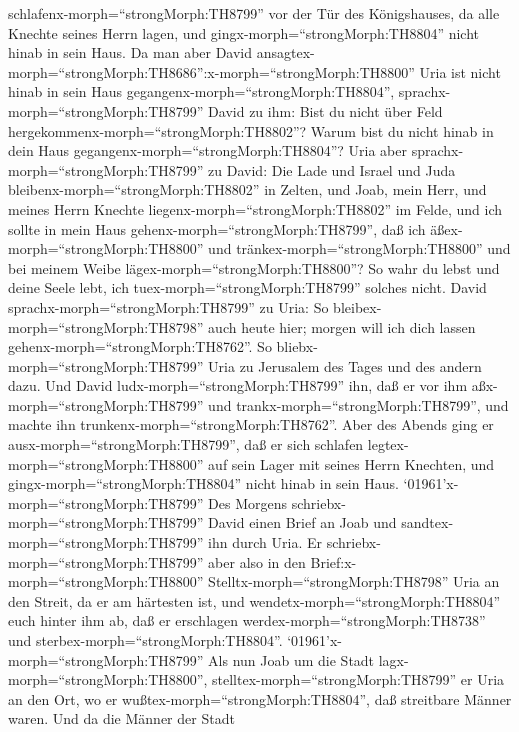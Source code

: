 schlafenx-morph=``strongMorph:TH8799'' vor der Tür des Königshauses, da
alle Knechte seines Herrn lagen, und gingx-morph=``strongMorph:TH8804''
nicht hinab in sein Haus.  Da man aber David
ansagtex-morph=``strongMorph:TH8686'':x-morph=``strongMorph:TH8800''
Uria ist nicht hinab in sein Haus
gegangenx-morph=``strongMorph:TH8804'',
sprachx-morph=``strongMorph:TH8799'' David zu ihm: Bist du nicht über
Feld hergekommenx-morph=``strongMorph:TH8802''? Warum bist du nicht
hinab in dein Haus gegangenx-morph=``strongMorph:TH8804''? 
Uria aber sprachx-morph=``strongMorph:TH8799'' zu David: Die Lade und
Israel und Juda bleibenx-morph=``strongMorph:TH8802'' in Zelten, und
Joab, mein Herr, und meines Herrn Knechte
liegenx-morph=``strongMorph:TH8802'' im Felde, und ich sollte in mein
Haus gehenx-morph=``strongMorph:TH8799'', daß ich
äßex-morph=``strongMorph:TH8800'' und
tränkex-morph=``strongMorph:TH8800'' und bei meinem Weibe
lägex-morph=``strongMorph:TH8800''? So wahr du lebst und deine Seele
lebt, ich tuex-morph=``strongMorph:TH8799'' solches nicht. 
David sprachx-morph=``strongMorph:TH8799'' zu Uria: So
bleibex-morph=``strongMorph:TH8798'' auch heute hier; morgen will ich
dich lassen gehenx-morph=``strongMorph:TH8762''. So
bliebx-morph=``strongMorph:TH8799'' Uria zu Jerusalem des Tages und des
andern dazu.  Und David ludx-morph=``strongMorph:TH8799''
ihn, daß er vor ihm aßx-morph=``strongMorph:TH8799'' und
trankx-morph=``strongMorph:TH8799'', und machte ihn
trunkenx-morph=``strongMorph:TH8762''. Aber des Abends ging er
ausx-morph=``strongMorph:TH8799'', daß er sich schlafen
legtex-morph=``strongMorph:TH8800'' auf sein Lager mit seines Herrn
Knechten, und gingx-morph=``strongMorph:TH8804'' nicht hinab in sein
Haus.  `01961'\textbar x-morph=``strongMorph:TH8799'' Des
Morgens schriebx-morph=``strongMorph:TH8799'' David einen Brief an Joab
und sandtex-morph=``strongMorph:TH8799'' ihn durch Uria. 
Er schriebx-morph=``strongMorph:TH8799'' aber also in den
Brief:x-morph=``strongMorph:TH8800''
Stelltx-morph=``strongMorph:TH8798'' Uria an den Streit, da er am
härtesten ist, und wendetx-morph=``strongMorph:TH8804'' euch hinter ihm
ab, daß er erschlagen werdex-morph=``strongMorph:TH8738'' und
sterbex-morph=``strongMorph:TH8804''. 
`01961'\textbar x-morph=``strongMorph:TH8799'' Als nun Joab um die Stadt
lagx-morph=``strongMorph:TH8800'', stelltex-morph=``strongMorph:TH8799''
er Uria an den Ort, wo er wußtex-morph=``strongMorph:TH8804'', daß
streitbare Männer waren.  Und da die Männer der Stadt
